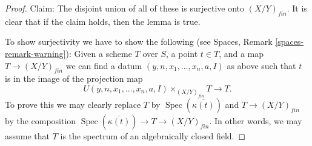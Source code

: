 \documentclass{stacks-project}
\theoremstyle{plain}
\theoremstyle{definition}
\theoremstyle{remark}
\numberwithin{equation}{subsection}
\def\Spec{\mathop{\mathrm{Spec}}}
\begin{document}
\begin{proof}
\medskip\noindent
Claim: The disjoint union of all of these is surjective onto $(X/Y)_{fin}$.
It is clear that if the claim holds, then the lemma is true.

\medskip\noindent
To show surjectivity we have to show the following (see
Spaces, Remark \ref{spaces-remark-warning}): Given a scheme $T$ over
$S$, a point $t \in T$, and a map $T \to (X/Y)_{fin}$ we can find a datum
$(y, n, x_1, \ldots, x_n, a, I)$ as above such that
$t$ is in the image of the projection map
$$
U(y, n, x_1, \ldots, x_n, a, I) \times_{(X/Y)_{fin}} T \longrightarrow T.
$$
To prove this we may clearly replace $T$ by
$\Spec(\overline{\kappa(t)})$ and
$T \to (X/Y)_{fin}$ by the composition
$\Spec(\overline{\kappa(t)}) \to T \to (X/Y)_{fin}$.
In other words, we may assume that $T$ is
the spectrum of an algebraically closed field.


\end{proof}
\end{document}
